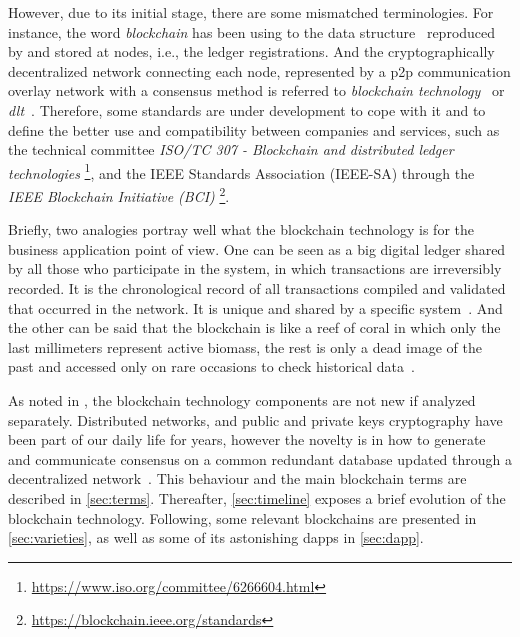 However, due to its initial stage, there are some mismatched terminologies.
For instance, the word \emph{blockchain} has been using to the data structure~\cite{xu2017} reproduced by and stored at nodes, i.e., the ledger registrations.
And the cryptographically decentralized network connecting each node, represented by a \gls{p2p} communication overlay network with a consensus method is referred to \emph{blockchain technology}~\cite{xu2016} or \emph{\gls{dlt}}~\cite{itu2017}.
Therefore, some standards are under development to cope with it and to define the better use and compatibility between companies and services, such as the technical committee \emph{ISO/TC 307 - Blockchain and distributed ledger technologies}
\footnote{\href{https://www.iso.org/committee/6266604.html}{https://www.iso.org/committee/6266604.html}}, and
the IEEE Standards Association (IEEE-SA) through the \emph{IEEE Blockchain Initiative (BCI)}
\footnote{\href{https://blockchain.ieee.org/standards}{https://blockchain.ieee.org/standards}}.

Briefly, two analogies portray well what the blockchain technology is for the business application point of view.
One can be seen as a big digital ledger shared by all those who participate in the system, in which transactions are irreversibly recorded.
It is the chronological record of all transactions compiled and validated that occurred in the network.
It is unique and shared by a specific system~\cite{block-endeavor}. %
And the other can be said that the blockchain is like a reef of coral in which only the last millimeters represent active biomass, the rest is only a dead image of the past and accessed only on rare occasions to check historical data~\cite{blocktrading}. %

As noted in , the blockchain technology components are not new if analyzed separately.
Distributed networks, and public and private keys cryptography have been part of our daily life for years,
however the novelty is in how to generate and communicate consensus on a common redundant database updated through a decentralized network~\cite{its2}.
This behaviour and the main blockchain terms are described in \autoref{sec:terms}.
Thereafter, \autoref{sec:timeline} exposes a brief evolution of the blockchain technology.
Following, some relevant blockchains are presented in \autoref{sec:varieties},
as well as some of its astonishing \glspl{dapp} in \autoref{sec:dapp}.

